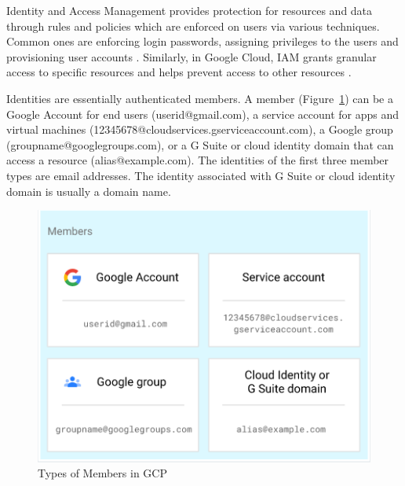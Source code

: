 \noindent Identity and Access Management provides protection for resources and data through rules and policies which are enforced on users via various techniques. Common ones are enforcing login passwords, assigning privileges to the users and provisioning user accounts \cite{AlmullaSameeraAbdulrahmanandYeun2010}.
Similarly, in Google Cloud, IAM grants granular access to specific resources and helps prevent access to other resources \cite{Googlecloudiam}.

Identities are essentially authenticated members. A member (Figure~\ref{fig:mem}) can be a Google Account for end users (userid@gmail.com), a service account for apps and virtual machines (12345678@cloudservices.gserviceaccount.com), a Google group (groupname@googlegroups.com), or a G Suite or cloud identity domain that can access a resource (alias@example.com). The identities of the first three member types are email addresses. The identity associated with G Suite or cloud identity domain is usually a domain name.
\begin{figure}[h]
  \centering
  \includegraphics[width=\linewidth]{pic/mem}
  \caption {Types of Members in GCP}
  \label{fig:mem}
\end{figure}

